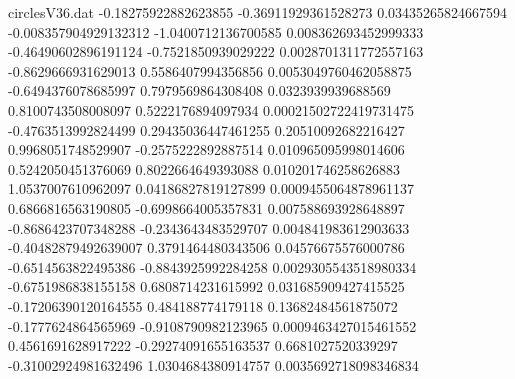 \begin{filecontents}{circlesV36.dat}
-0.18275922882623855	-0.36911929361528273	0.03435265824667594
-0.008357904929132312	-1.0400712136700585	0.008362693452999333
-0.46490602896191124	-0.7521850939029222	0.0028701311772557163
-0.8629666931629013	0.5586407994356856	0.0053049760462058875
-0.6494376078685997	0.7979569864308408	0.0323939939688569
0.8100743508008097	0.5222176894097934	0.00021502722419731475
-0.4763513992824499	0.29435036447461255	0.20510092682216427
0.9968051748529907	-0.2575222892887514	0.010965095998014606
0.5242050451376069	0.8022664649393088	0.010201746258626883
1.0537007610962097	0.04186827819127899	0.0009455064878961137
0.6866816563190805	-0.6998664005357831	0.007588693928648897
-0.8686423707348288	-0.2343643483529707	0.004841983612903633
-0.40482879492639007	0.3791464480343506	0.04576675576000786
-0.6514563822495386	-0.8843925992284258	0.0029305543518980334
-0.6751986838155158	0.6808714231615992	0.031685909427415525
-0.17206390120164555	0.484188774179118	0.13682484561875072
-0.1777624864565969	-0.9108790982123965	0.0009463427015461552
0.4561691628917222	-0.29274091655163537	0.6681027520339297
-0.31002924981632496	1.0304684380914757	0.0035692718098346834
\end{filecontents}